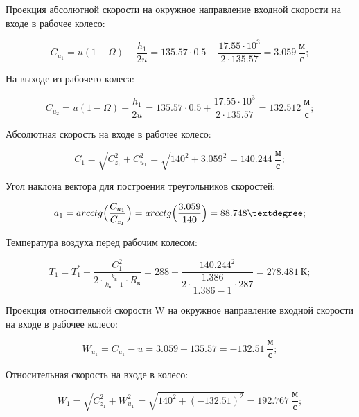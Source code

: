 Проекция абсолютной скорости на окружное направление входной скорости на входе в рабочее колесо:

\begin{equation} \label{eu_eqn}
	C_{u_{1}}=u(1-\Omega)-\dfrac{h_{1}}{2u}=135.57\cdot0.5- \dfrac{17.55\cdot 10^3}{2\cdot 135.57}=3.059\ \dfrac{\text{м}}{\text{с}};
\end{equation}

На выходе из рабочего колеса:

\begin{equation} \label{eu_eqn}
	C_{u_{2}}=u(1-\Omega)+\dfrac{h_{1}}{2u}=135.57\cdot0.5+ \dfrac{17.55\cdot 10^3}{2\cdot 135.57}=132.512\ \dfrac{\text{м}}{\text{с}};
\end{equation}

Абсолютная скорость на входе в рабочее колесо:

\begin{equation} \label{eu_eqn}
	C_{1}=\sqrt{ C_{z_{1}}^2+C_{u_{1}}^2 }=\sqrt{ 140^2+3.059^2 }=140.244 \ \dfrac{\text{м}}{\text{с}};
\end{equation}

Угол наклона вектора  для построения треугольников скоростей:

\begin{equation} \label{eu_eqn}
	a_{1}=arcctg\Bigl( \dfrac{C_{u_{1}}}{C_{z_{1}}} \Bigr)=arcctg\Bigl( \dfrac{3.059}{140} \Bigr)=88.748 \textdegree;
\end{equation}

Температура воздуха перед рабочим колесом:

\begin{equation} \label{eu_eqn}
	T_{1}=T_{1}^*-\dfrac{C_{1}^2}{2\cdot  \frac{k_{\text{в}}}{k_{\text{в}}-1}\cdot R_{\text{в}}}=288- \dfrac{140.244^2}{2\cdot  \dfrac{1.386}{1.386-1}\cdot287}=278.481 \ \text{К};
\end{equation}

Проекция относительной скорости W на окружное направление входной скорости на входе в рабочее колесо:

\begin{equation} \label{eu_eqn}
	W_{u_{1}}=C_{u_{1}}-u=3.059-135.57=-132.51 \ \dfrac{\text{м}}{\text{с}};
\end{equation}

Относительная скорость на входе в колесо:

\begin{equation} \label{eu_eqn}
	W_{1}=\sqrt{ C_{z_{1}}^2+W_{u_{1}}^2 }=\sqrt{ 140^2+(-132.51)^2 }=192.767 \ \dfrac{\text{м}}{\text{с}};
\end{equation}

